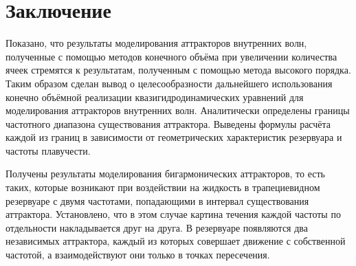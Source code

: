 \chapter*{Заключение}
\label{cha:Conclusion}





Показано, что результаты моделирования аттракторов внутренних волн, полученные с помощью методов конечного объёма при увеличении количества ячеек стремятся к результатам, полученным с помощью метода высокого порядка. Таким образом сделан вывод о целесообразности дальнейшего использования конечно объёмной реализации квазигидродинамических уравнений для моделирования аттракторов внутренних волн. 
Аналитически определены  границы частотного диапазона существования аттрактора. Выведены формулы расчёта каждой из границ в зависимости от геометрических характеристик резервуара и частоты плавучести.


Получены результаты моделирования бигармонических аттракторов, то есть таких, которые возникают при воздействии на жидкость в трапециевидном резервуаре с двумя частотами, попадающими в интервал существования аттрактора. Установлено, что в этом случае картина течения каждой частоты по отдельности накладывается друг на друга. В резервуаре появляются два независимых аттрактора, каждый из которых совершает движение с собственной частотой, а взаимодействуют они только в точках пересечения. 


